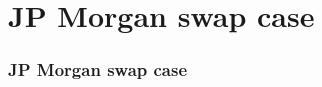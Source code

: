 \documentclass[main.tex]{subfiles}
\begin{document}
    \section{JP Morgan swap case}
    \begin{frame}
        \frametitle{JP Morgan swap case}
        
        \begin{figure}
            \centering
            \resizebox{\textwidth}{!}{%
            \begin{tikzpicture}
                
            \end{tikzpicture}
            }   
        \end{figure}

    \end{frame}
\end{document}
